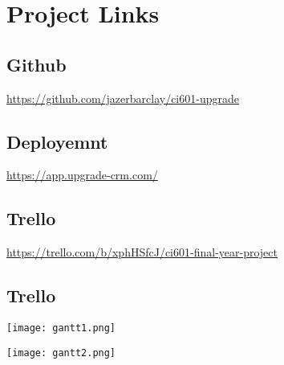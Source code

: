 
\chapter{Project Links} %

\label{AppendixA} %

\section{Github}\label{AppendixA:Github}

\href{https://github.com/jazerbarclay/ci601-upgrade}{https://github.com/jazerbarclay/ci601-upgrade}


\section{Deployemnt}\label{AppendixA:Deploy}

\href{https://app.upgrade-crm.com/}{https://app.upgrade-crm.com/}


\section{Trello}\label{AppendixA:Trello}

\href{https://trello.com/b/xphHSfcJ/ci601-final-year-project}{https://trello.com/b/xphHSfcJ/ci601-final-year-project}


\section{Trello}\label{AppendixA:Gantt}

\centerline{\texttt{[image: gantt1.png]}}

\centerline{\texttt{[image: gantt2.png]}}